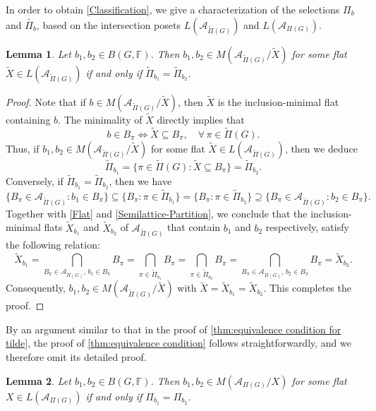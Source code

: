 \documentclass[12pt]{article}%
\renewcommand*{\bm}[1]{#1}%
\numberwithin{equation}{section}
\newtheorem{lemma}[lemma]{Lemma}
\begin{document}
In order to obtain \autoref{Classification}, we give a characterization of the selections $\Pi_{\bm b}$ and $\tilde{\Pi_{\bm b}}$, based on the intersection posets $L(\mathcal{A}_{\tilde{\Pi}(G)})$ and $L(\mathcal{A}_{\Pi(G)})$.

\begin{lemma}\label{thm:equivalence condition for tilde}
Let $\bm b_1,\bm b_2\in B(G,\mathbb{F})$. Then $\bm b_1,\bm b_2\in M(\mathcal{A}_{\tilde{\Pi}(G)}/\tilde{X})$ for some flat $\tilde{X}\in L(\mathcal{A}_{\tilde{\Pi}(G)})$ if and only if 
$\tilde{\Pi}_{\bm b_1}=\tilde{\Pi}_{\bm b_2}$.
\end{lemma}
\begin{proof}
Note that if $\bm b\in M(\mathcal{A}_{\tilde{\Pi}(G)}/\tilde{X})$, then $\tilde{X}$ is the inclusion-minimal flat containing $\bm b$. The minimality of $\tilde{X}$ directly implies that 
\[
\bm b\in B_\pi\Longleftrightarrow \tilde{X}\subseteq B_\pi,\quad\forall\, \pi\in\tilde{\Pi}(G).
\]
Thus, if $\bm b_1,\bm b_2\in M(\mathcal{A}_{\tilde{\Pi}(G)}/\tilde{X})$  for some flat $\tilde{X}\in L(\mathcal{A}_{\tilde{\Pi}(G)})$, then we deduce
\[
\tilde{\Pi}_{\bm b_1}=\big\{\pi\in\tilde{\Pi}(G):\tilde{X}\subseteq B_\pi\big\}=\tilde{\Pi}_{\bm b_2}.
\]
Conversely, if $\tilde{\Pi}_{\bm b_1}=\tilde{\Pi}_{\bm b_2}$, then we have
\[
\{B_\pi\in\mathcal{A}_{\tilde{\Pi}(G)}:\bm b_1\in B_\pi\}\subseteq \{B_\pi:\pi\in\tilde{\Pi}_{\bm b_1}\}=\{B_\pi:\pi\in\tilde{\Pi}_{\bm b_2}\}\supseteq \{B_\pi\in\mathcal{A}_{\tilde{\Pi}(G)}:\bm b_2\in B_\pi\}.
\]
Together with \eqref{Flat} and \eqref{Semilattice-Partition}, we conclude that the inclusion-minimal flats $\tilde{X}_{\bm b_1}$ and $\tilde{X}_{\bm b_2}$ of $\mathcal{A}_{\tilde{\Pi}(G)}$ that contain $\bm b_1$ and $\bm b_2$ respectively, satisfy the following relation:
\begin{equation*}
\tilde{X}_{\bm b_1}=\bigcap_{B_\pi\in\mathcal{A}_{\tilde{\Pi}(G)},\,\bm b_1\in B_\pi}B_\pi=\bigcap_{\pi\in\tilde{\Pi}_{\bm b_1}}B_\pi=\bigcap_{\pi\in\tilde{\Pi}_{\bm b_2}}B_\pi=\bigcap_{B_\pi\in\mathcal{A}_{\tilde{\Pi}(G)},\,\bm b_2\in B_\pi}B_\pi=\tilde{X}_{\bm b_2}.
\end{equation*}
Consequently, $\bm b_1,\bm b_2\in M(\mathcal{A}_{\tilde{\Pi}(G)}/\tilde{X})$ with $\tilde{X}=\tilde{X}_{\bm b_1}=\tilde{X}_{\bm b _2}$. This completes the proof.
\end{proof}

By an argument similar to that in the proof of \autoref{thm:equivalence condition for tilde}, the proof of \autoref{thm:equivalence condition} follows straightforwardly, and we therefore omit its detailed proof.
\begin{lemma}\label{thm:equivalence condition}
Let $\bm b_1,\bm b_2\in B(G,\mathbb{F})$. Then $\bm b_1,\bm b_2\in M(\mathcal{A}_{\Pi(G)}/X)$  for some flat $X\in L(\mathcal{A}_{\Pi(G)})$ if and only if $\Pi_{\bm b_1}=\Pi_{\bm b_2}$.
\end{lemma}
\end{document}
